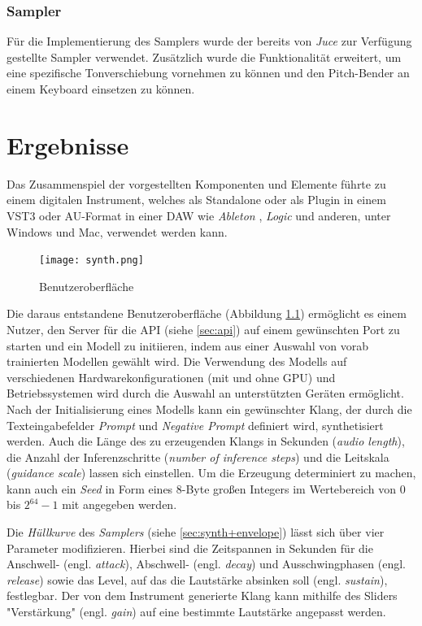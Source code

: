 \documentclass[
  a4paper,  %
  twoside,  %
  bibliography=totoc,
  headsepline,
  cleardoublepage=empty,
  parskip=half,
  draft=false
]{scrbook}
\begin{document}
\subsection{Sampler}

Für die Implementierung des Samplers wurde der bereits von \emph{Juce}\cite{noauthor_juce_nodate-1} zur Verfügung gestellte Sampler \cite{noauthor_juce_nodate} verwendet. Zusätzlich wurde die Funktionalität erweitert, um eine spezifische Tonverschiebung vornehmen zu können und den Pitch-Bender an einem Keyboard einsetzen zu können.

\chapter{Ergebnisse}
Das Zusammenspiel der vorgestellten Komponenten und Elemente führte zu einem digitalen Instrument, welches als Standalone oder als Plugin in einem VST3 oder AU-Format in einer DAW wie \emph{Ableton} \cite{noauthor_ableton_nodate}, \emph{Logic} \cite{noauthor_logic_nodate} und anderen, unter Windows und Mac, verwendet werden kann.

\begin{figure}[h]
  \centering
  \texttt{[image: synth.png]}
  \caption[Benutzeroberfläche]{Benutzeroberfläche}
  \label{fig:synth}
\end{figure} 

Die daraus entstandene Benutzeroberfläche (Abbildung \ref{fig:synth}) ermöglicht es einem Nutzer, den Server für die API (siehe \ref{sec:api}) auf einem gewünschten Port  zu starten und ein Modell zu initiieren, indem aus einer Auswahl von vorab trainierten Modellen gewählt wird. Die Verwendung des Modells auf verschiedenen Hardwarekonfigurationen (mit und ohne GPU) und Betriebssystemen wird durch die Auswahl an unterstützten Geräten ermöglicht. Nach der Initialisierung eines Modells kann ein gewünschter Klang, der durch die Texteingabefelder \emph{Prompt} und \emph{Negative Prompt} definiert wird, synthetisiert werden. Auch die Länge des zu erzeugenden Klangs in Sekunden (\emph{audio length}), die Anzahl der Inferenzschritte (\emph{number of inference steps}) und die Leitskala (\emph{guidance scale}) lassen sich einstellen. Um die Erzeugung determiniert zu machen, kann auch ein \emph{Seed} in Form eines 8-Byte großen Integers im Wertebereich von $0$ bis $2^{64}-1$ mit angegeben werden.  

Die \emph{Hüllkurve} des \emph{Samplers} (siehe \ref{sec:synth+envelope}) lässt sich über vier Parameter modifizieren. Hierbei sind die Zeitspannen in Sekunden für die Anschwell- (engl. \emph{attack}), Abschwell- (engl. \emph{decay}) und Ausschwingphasen (engl. \emph{release}) sowie das Level, auf das die Lautstärke absinken soll (engl. \emph{sustain}), festlegbar. Der von dem Instrument generierte Klang kann mithilfe des Sliders "Verstärkung" (engl. \emph{gain}) auf eine bestimmte Lautstärke angepasst werden.
\end{document}
